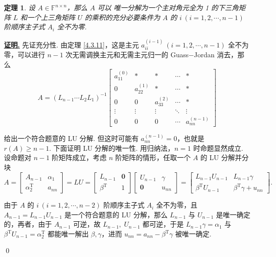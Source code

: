 \documentclass[10pt,openany]{article}
\theoremstyle{thmstyle} %
\newtheorem{theorem}{定理}[subsection]
\theoremstyle{defstyle} %
\theoremstyle{prostyle} %
\theoremstyle{exastyle}
\theoremstyle{remstyle}
\renewenvironment{proof}[1][证明]{\par\underline{\textbf{#1.}} \;\fangsong}{\qed\par}
\newcommand{\T}{^{\text{T}}}
\newcommand{\F}{\mathbb{F}}
\newcommand{\n}{^{n \times n}}
\begin{document}
\begin{theorem} \label{4.3.12}
	设 \( A \in \F\n \)，那么 \( A \) 可以{\color{blue} 唯一分解}为一个主对角元全为 1 的下三角矩阵 \( L \) 和一个上三角矩阵 \( U \) 的乘积的充分必要条件为 \( A \) 的 \( i \ (i=1,2,\cdots,n-1) \) 阶顺序主子式 \( A_i \) 全不为零.
\end{theorem}

\begin{proof}
	先证充分性. 由定理 \ref{4.3.11}，这是主元 \( a_{ii}^{(i-1)} \ (i=1,2,\cdots,n-1) \) 全不为零，可以进行  \( n-1 \) 次无需调换主元和无需主元归一的 Guass\(-\)Jordan 消去，那么
	\[ A= (L_{n-1}\cdots L_2L_1)^{-1}\begin{bmatrix}
		a_{11}^{(0)} & * & * & \cdots & * \\[1ex]
		0 & a_{22}^{(1)} & * & \cdots & * \\[1ex]
		0 & 0 & a_{33}^{(2)} & \cdots & * \\[1ex]
		\vdots & \vdots & \vdots & \ddots & \vdots \\[1ex]
		0 & 0 & 0 & \cdots & a_{nn}^{(n-1)}
	\end{bmatrix} \]
	
	给出一个符合题意的 LU 分解. 但这时可能有 \( a_{nn}^{(n-1)}=0 \)，也就是 \( r(A) \geq n-1 \). 下面证明 LU 分解的唯一性. 用归纳法，\( n=1 \) 时命题显然成立. 设命题对 \( n-1 \) 阶矩阵成立，考虑 \( n \) 阶矩阵的情形，任取一个 \( A \) 的 LU 分解并分块
	\[ A=\begin{bmatrix}
		A_{n-1} & \alpha_1 \\
		\alpha_2\T & a_{nn}
	\end{bmatrix}=LU=\begin{bmatrix}
	 L_{n-1} & \bm{0} \\
	 \beta\T & 1
	\end{bmatrix}\begin{bmatrix}
	 U_{n-1} & \gamma \\
	 \bm{0} & u_{nn}
	\end{bmatrix}=\begin{bmatrix}
	L_{n-1}U_{n-1} & L_{n-1}\gamma \\
	\beta\T U_{n-1} & \beta\T \gamma+u_{nn}
	\end{bmatrix}. \]
	
	由于 \( A \) 的 \( i \ (i=1,2,\cdots,n-2) \) 阶顺序主子式 \( A_i \) 全不为零，且 \( A_{n-1}=L_{n-1}U_{n-1} \) 是一个符合题意的 LU 分解，那么 \( L_{n-1} \) 与 \( U_{n-1} \) 是唯一确定的，再者，由于 \( A_{n-1} \) 可逆，故 \( L_{n-1}, \; U_{n-1} \) 都可逆，于是 \( L_{n-1}\gamma=\alpha_1 \) 与 \( \beta\T U_{n-1}=\alpha_2\T \) 都能唯一解出 \( \beta, \gamma \)，进而 \( u_{nn}=a_{nn}-\beta\T \gamma \) 被唯一确定.
	

\end{proof}
\end{document}
